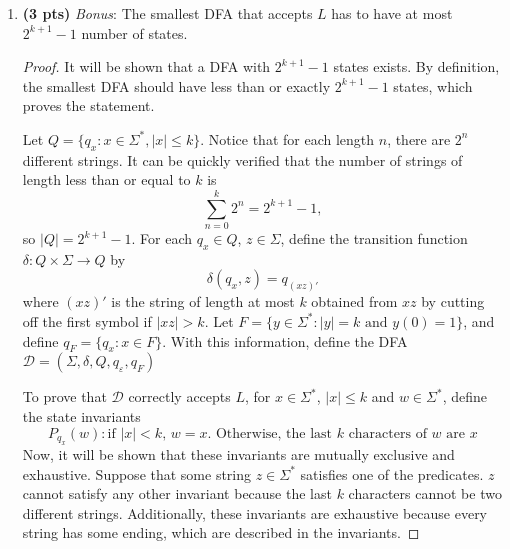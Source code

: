 \documentclass[11pt]{article}
\begin{document}
\begin{enumerate}[label=\textbf{Q\arabic*.}]
\begin{enumerate}[label=\textit{\alph*)}]
\begin{proof}
	If the transition \(q_0 \xrightarrow{1}q_0\) is always taken, \(w\) can never be accepted. On the other hand, if the transition \(q_0 \xrightarrow{1}q_1\) is taken for some \(w(i_j)\), then \(w\) is rejected by the induction hypothesis.

	By the principle of complete induction, it can be concluded that there is no path where \(\mathcal{N}\) accepts \(w \notin L\).

	Therefore, the NFA \(\mathcal{N}\) correctly accepts \(L\), completing the proof.
	\medbreak
\end{proof}

\pagebreak

\item \textbf{(3 pts)} \textit{Bonus}: The smallest DFA that accepts $L$ has to have at most $2^{k+1}-1$ number of states.

\begin{proof}
	It will be shown that a DFA with \(2^{k+1} - 1\) states exists. By definition, the smallest DFA should have less than or exactly \(2^{k+1} - 1\) states, which proves the statement.

	Let \(Q = \{q_x : x \in \Sigma ^*, |x| \leq k \}\). Notice that for each length \(n\), there are \(2^n\) different strings. It can be quickly verified that the number of strings of length less than or equal to \(k\) is
	\[
		\sum_{n=0}^k 2^n = 2^{k+1} - 1,
	\]
	so \(|Q| = 2^{k+1} - 1\). For each \(q_x \in Q\), \(z \in \Sigma\), define the transition function \(\delta : Q \times \Sigma \to Q\) by
	\[
		\delta (q_x, z) = q_{(xz)'}
	\]
	where \((xz)'\) is the string of length at most \(k\) obtained from \(xz\) by cutting off the first symbol if \(|xz| > k\). Let \(F = \{ y \in \Sigma ^* : |y| = k \text{ and } y(0) = 1\}\), and define \(q_F = \{q_x : x \in F\}\). With this information, define the DFA \(\mathcal{D} = (\Sigma , \delta , Q, q_{\varepsilon}, q_F)\) 
	
	To prove that \(\mathcal{D}\) correctly accepts \(L\), for \(x \in \Sigma ^*\), \(|x| \leq k\) and \(w \in \Sigma^*\), define the state invariants
	\[
		P_{q_x}(w) : \text{if } |x| < k \text{, } w=x \text{. Otherwise, the last } k \text{ characters of } w \text{ are } x
	\]
	Now, it will be shown that these invariants are mutually exclusive and exhaustive. Suppose that some string \(z \in \Sigma ^*\) satisfies one of the predicates. \(z\) cannot satisfy any other invariant because the last \(k\) characters cannot be two different strings. Additionally, these invariants are exhaustive because every string has some ending, which are described in the invariants.


\end{proof}
\end{enumerate}
\end{enumerate}
\end{document}
